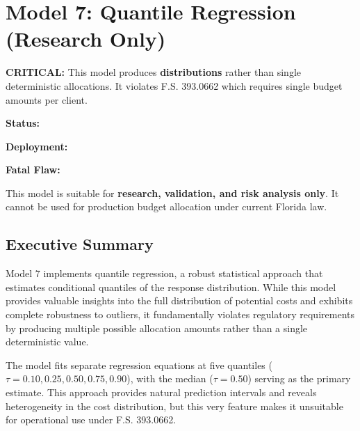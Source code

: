 
\chapter{Model 7: Quantile Regression (Research Only)}
\label{ch:model7}



\begin{tcolorbox}[colback=red!10!white, colframe=red!75!black, title=\textbf{REGULATORY WARNING: NOT COMPLIANT}]
\textbf{CRITICAL:} This model produces \textbf{distributions} rather than single deterministic allocations. It violates F.S. 393.0662 which requires single budget amounts per client. 

\textbf{Status:} \ModelSevenRegulatoryCompliant

\textbf{Deployment:} \ModelSevenDeploymentStatus

\textbf{Fatal Flaw:} \ModelSevenFatalFlaw

This model is suitable for \textbf{research, validation, and risk analysis only}. It cannot be used for production budget allocation under current Florida law.
\end{tcolorbox}

\section{Executive Summary}

Model 7 implements quantile regression, a robust statistical approach that estimates conditional quantiles of the response distribution. While this model provides valuable insights into the full distribution of potential costs and exhibits complete robustness to outliers, it fundamentally violates regulatory requirements by producing multiple possible allocation amounts rather than a single deterministic value.

The model fits separate regression equations at five quantiles ($\tau = 0.10, 0.25, 0.50, 0.75, 0.90$), with the median ($\tau = 0.50$) serving as the primary estimate. This approach provides natural prediction intervals and reveals heterogeneity in the cost distribution, but this very feature makes it unsuitable for operational use under F.S. 393.0662.

